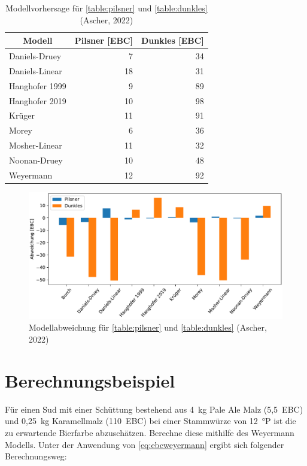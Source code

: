 \documentclass[a4paper,parskip=half]{scrartcl}
\begin{document}
\begin{table}[H]
\centering
\begin{tabular}{lrr}
\toprule
\multicolumn{1}{c}{\textbf{Modell}} & \multicolumn{1}{c}{\textbf{Pilsner [EBC]}} & \multicolumn{1}{c}{\textbf{Dunkles [EBC]}} \\
\midrule
Daniels-Druey & 7 & 34 \\
Daniels-Linear & 18 & 31 \\
Hanghofer 1999 & 9 & 89 \\
Hanghofer 2019 & 10 & 98 \\
Krüger & 11 & 91 \\
Morey & 6 & 36 \\
Mosher-Linear & 11 & 32 \\
Noonan-Druey & 10 & 48 \\
Weyermann & 12 & 92 \\
\bottomrule
\end{tabular}
\caption{Modellvorhersage für \autoref{table:pilsner} und \autoref{table:dunkles} (Ascher, 2022)}
\label{table:modelcompare}
\end{table}

\begin{figure}[h]
\centering
\includegraphics[width=14cm]{graph_dev.pdf}
\caption{Modellabweichung für \autoref{table:pilsner} und \autoref{table:dunkles} (Ascher, 2022)}
\label{fig:modelcompare}
\end{figure}

\section*{Berechnungsbeispiel}

Für einen Sud mit einer Schüttung bestehend aus 4~kg Pale Ale Malz (5,5~EBC) und 0,25~kg Kara­mell­mal­z (110~EBC) bei einer Stammwürze von 12~°P ist die zu erwartende Bierfarbe abzuschätzen. Berechne diese mithilfe des Weyermann Modells. Unter der Anwendung von \autoref{eq:ebcweyermann} ergibt sich folgender Berechnungsweg:
\end{document}
